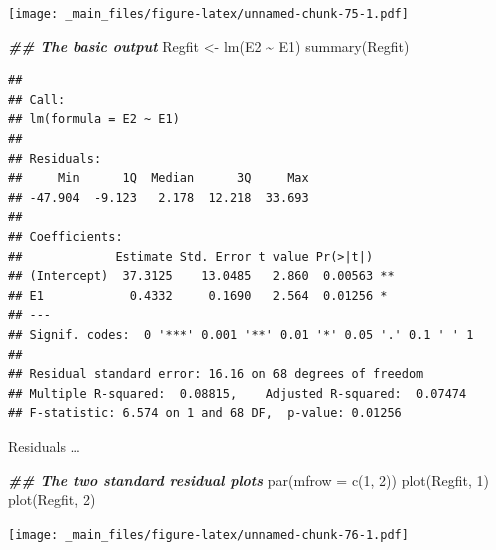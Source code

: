 \documentclass[
]{book}
\newenvironment{Shaded}{\begin{snugshade}}{\end{snugshade}}
\newcommand{\AttributeTok}[1]{\textcolor[rgb]{0.77,0.63,0.00}{#1}}
\newcommand{\DecValTok}[1]{\textcolor[rgb]{0.00,0.00,0.81}{#1}}
\newcommand{\DocumentationTok}[1]{\textcolor[rgb]{0.56,0.35,0.01}{\textbf{\textit{#1}}}}
\newcommand{\FunctionTok}[1]{\textcolor[rgb]{0.00,0.00,0.00}{#1}}
\newcommand{\NormalTok}[1]{#1}
\newcommand{\OtherTok}[1]{\textcolor[rgb]{0.56,0.35,0.01}{#1}}
\newcommand{\SpecialCharTok}[1]{\textcolor[rgb]{0.00,0.00,0.00}{#1}}
\begin{document}
\texttt{[image: \_main\_files/figure-latex/unnamed-chunk-75-1.pdf]}

\begin{Shaded}
\begin{Highlighting}[]
\DocumentationTok{\#\# The basic output}
\NormalTok{Regfit }\OtherTok{\textless{}{-}} \FunctionTok{lm}\NormalTok{(E2 }\SpecialCharTok{\textasciitilde{}}\NormalTok{ E1)}
\FunctionTok{summary}\NormalTok{(Regfit)}
\end{Highlighting}
\end{Shaded}

\begin{verbatim}
## 
## Call:
## lm(formula = E2 ~ E1)
## 
## Residuals:
##     Min      1Q  Median      3Q     Max 
## -47.904  -9.123   2.178  12.218  33.693 
## 
## Coefficients:
##             Estimate Std. Error t value Pr(>|t|)   
## (Intercept)  37.3125    13.0485   2.860  0.00563 **
## E1            0.4332     0.1690   2.564  0.01256 * 
## ---
## Signif. codes:  0 '***' 0.001 '**' 0.01 '*' 0.05 '.' 0.1 ' ' 1
## 
## Residual standard error: 16.16 on 68 degrees of freedom
## Multiple R-squared:  0.08815,    Adjusted R-squared:  0.07474 
## F-statistic: 6.574 on 1 and 68 DF,  p-value: 0.01256
\end{verbatim}

Residuals \ldots{}

\begin{Shaded}
\begin{Highlighting}[]
\DocumentationTok{\#\# The two standard residual plots}
\FunctionTok{par}\NormalTok{(}\AttributeTok{mfrow =} \FunctionTok{c}\NormalTok{(}\DecValTok{1}\NormalTok{, }\DecValTok{2}\NormalTok{))}
\FunctionTok{plot}\NormalTok{(Regfit, }\DecValTok{1}\NormalTok{)}
\FunctionTok{plot}\NormalTok{(Regfit, }\DecValTok{2}\NormalTok{)}
\end{Highlighting}
\end{Shaded}

\texttt{[image: \_main\_files/figure-latex/unnamed-chunk-76-1.pdf]}
\end{document}
